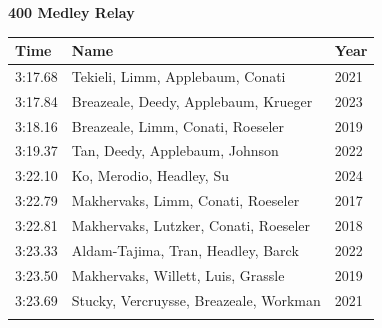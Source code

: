 \vspace{1.2em}
\noindent\begin{minipage}[t]{0.98\textwidth}
\centering
\textbf{\textcolor{teamprimary}{400 Medley Relay}}\par
\vspace{0.5em}
\centering
\small
\renewcommand{\arraystretch}{1.0}
\setlength{\tabcolsep}{4pt}
\begin{tabular}{@{}p{4.5cm}p{8.5cm}p{2.5cm}@{}}
\toprule
\textbf{Time} & \textbf{Name} & \textbf{Year} \\
\midrule
3:17.68 & Tekieli, Limm, Applebaum, Conati & 2021 \\
3:17.84 & Breazeale, Deedy, Applebaum, Krueger & 2023 \\
3:18.16 & Breazeale, Limm, Conati, Roeseler & 2019 \\
3:19.37 & Tan, Deedy, Applebaum, Johnson & 2022 \\
3:22.10 & Ko, Merodio, Headley, Su & 2024 \\
3:22.79 & Makhervaks, Limm, Conati, Roeseler & 2017 \\
3:22.81 & Makhervaks, Lutzker, Conati, Roeseler & 2018 \\
3:23.33 & Aldam-Tajima, Tran, Headley, Barck & 2022 \\
3:23.50 & Makhervaks, Willett, Luis, Grassle & 2019 \\
3:23.69 & Stucky, Vercruysse, Breazeale, Workman & 2021 \\
\bottomrule
\vspace{0.5em}
\end{tabular}
\end{minipage}